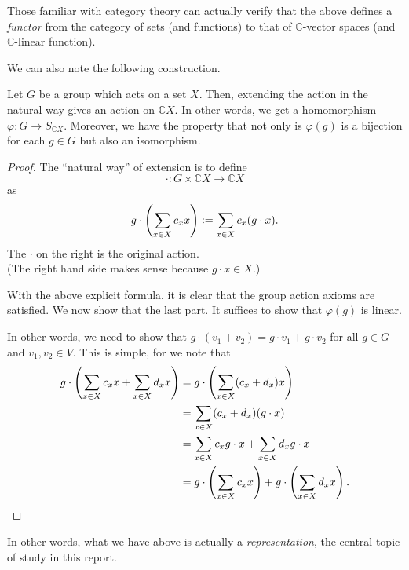Those familiar with category theory can actually verify that the above defines a \emph{functor} from the category of sets (and functions) to that of $\mathbb{C}$-vector spaces (and $\mathbb{C}$-linear function).

We can also note the following construction.

\begin{prop} \label{prop:extendingactiontorep}
	Let $G$ be a group which acts on a set $X.$ Then, extending the action in the natural way gives an action on $\mathbb{C}X.$ In other words, we get a homomorphism $\varphi : G \to S_{\mathbb{C}X}.$ Moreover, we have the property that not only is $\varphi(g)$ is a bijection for each $g \in G$ but also an isomorphism.
\end{prop}
\begin{proof} 
	The ``natural way'' of extension is to define
	\begin{equation*} 
		\cdot : G \times \mathbb{C}X \to \mathbb{C}X
	\end{equation*}
	as
	\begin{equation*} 
		g\cdot\left(\sum_{x \in X} c_x x\right) \vcentcolon= \sum_{x \in X} c_x (g \cdot x).
	\end{equation*}
	The $\cdot$ on the right is the original action.\\
	(The right hand side makes sense because $g \cdot x \in X.$)

	With the above explicit formula, it is clear that the group action axioms are satisfied. We now show that the last part. It suffices to show that $\varphi(g)$ is linear.

	In other words, we need to show that $g \cdot (v_1 + v_2) = g \cdot v_1 + g \cdot v_2$ for all $g \in G$ and $v_1, v_2 \in V.$ This is simple, for we note that
	\begin{align*} 
		g \cdot \left(\sum_{x \in X} c_xx + \sum_{x \in X} d_xx \right) &= g \cdot \left(\sum_{x \in X} (c_x + d_x)x \right)\\
		&= \sum_{x \in X} (c_x + d_x)(g \cdot x)\\
		&= \sum_{x \in X} c_x g \cdot x + \sum_{x \in X} d_x g \cdot x\\
		&= g \cdot \left(\sum_{x \in X} c_x x\right) + g \cdot \left(\sum_{x \in X}d_x x\right). \qedhere
	\end{align*}
\end{proof}

In other words, what we have above is actually a \emph{representation}, the central topic of study in this report.


